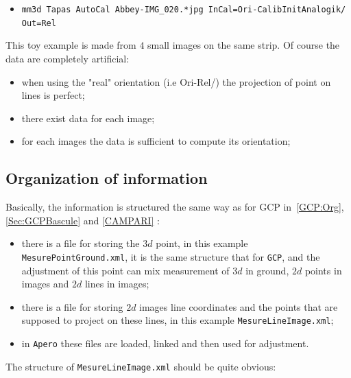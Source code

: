 \begin{itemize}
   \item {\tt mm3d Tapas AutoCal Abbey-IMG\_020.*jpg InCal=Ori-CalibInitAnalogik/ Out=Rel}

\end{itemize}

This toy example is made from $4$ small images on the same strip. Of course the data are completely  artificial:

\begin{itemize}
   \item when using the "real" orientation (i.e Ori-Rel/) the projection of point on lines is perfect;
   \item there exist data for each image;
   \item for each images the data is sufficient to compute its orientation;
\end{itemize}


\subsection{Organization of information}

Basically, the information is structured the same way as for GCP in~\ref{GCP:Org},\ref{Sec:GCPBascule} and 
\ref{CAMPARI} : 

\begin{itemize}
   \item there is a file for storing the $3d$ point, in this example {\tt MesurePointGround.xml}, it is the same
         structure that for {\tt GCP}, and the adjustment of this point can mix measurement of $3d$ in ground,
         $2d$ points in images and $2d$ lines in images;

   \item there is a file for storing $2d$ images line coordinates and the points that are supposed to project 
         on these lines, in this example {\tt MesureLineImage.xml};

   \item in {\tt Apero} these files are loaded, linked and then used for adjustment.
\end{itemize}

The structure of {\tt MesureLineImage.xml} should be quite obvious:

